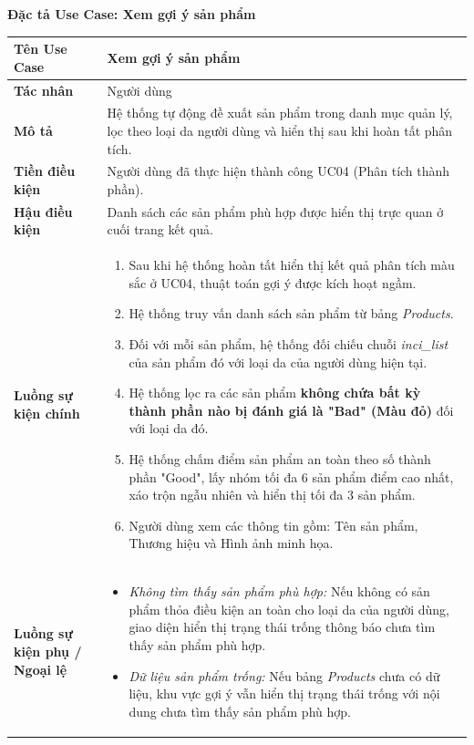 \documentclass[12pt,a4paper]{article}
\begin{document}
\textbf{Đặc tả Use Case: Xem gợi ý sản phẩm}

\begin{center}
\renewcommand{\arraystretch}{1.4}
\begin{tabular}{|p{4cm}|p{10cm}|}
\hline
\rowcolor{blue!15}
\textbf{Tên Use Case} & \textbf{Xem gợi ý sản phẩm} \\ \hline
\textbf{Tác nhân} & Người dùng \\ \hline
\textbf{Mô tả} & Hệ thống tự động đề xuất sản phẩm trong danh mục quản lý, lọc theo loại da người dùng và hiển thị sau khi hoàn tất phân tích. \\ \hline
\textbf{Tiền điều kiện} & Người dùng đã thực hiện thành công UC04 (Phân tích thành phần). \\ \hline
\textbf{Hậu điều kiện} & Danh sách các sản phẩm phù hợp được hiển thị trực quan ở cuối trang kết quả. \\ \hline
\textbf{Luồng sự kiện chính} & 
\begin{enumerate}
    \item Sau khi hệ thống hoàn tất hiển thị kết quả phân tích màu sắc ở UC04, thuật toán gợi ý được kích hoạt ngầm.
    \item Hệ thống truy vấn danh sách sản phẩm từ bảng \textit{Products}.
    \item Đối với mỗi sản phẩm, hệ thống đối chiếu chuỗi \textit{inci\_list} của sản phẩm đó với loại da của người dùng hiện tại.
    \item Hệ thống lọc ra các sản phẩm \textbf{không chứa bất kỳ thành phần nào bị đánh giá là "Bad" (Màu đỏ)} đối với loại da đó.
    \item Hệ thống chấm điểm sản phẩm an toàn theo số thành phần "Good", lấy nhóm tối đa 6 sản phẩm điểm cao nhất, xáo trộn ngẫu nhiên và hiển thị tối đa 3 sản phẩm.
    \item Người dùng xem các thông tin gồm: Tên sản phẩm, Thương hiệu và Hình ảnh minh họa.
\end{enumerate} \\ \hline
\textbf{Luồng sự kiện phụ / Ngoại lệ} & 
\begin{itemize}
    \item \textit{Không tìm thấy sản phẩm phù hợp:} Nếu không có sản phẩm thỏa điều kiện an toàn cho loại da của người dùng, giao diện hiển thị trạng thái trống thông báo chưa tìm thấy sản phẩm phù hợp.
    \item \textit{Dữ liệu sản phẩm trống:} Nếu bảng \textit{Products} chưa có dữ liệu, khu vực gợi ý vẫn hiển thị trạng thái trống với nội dung chưa tìm thấy sản phẩm phù hợp.
\end{itemize} \\ \hline
\end{tabular}
\end{center}
\end{document}
